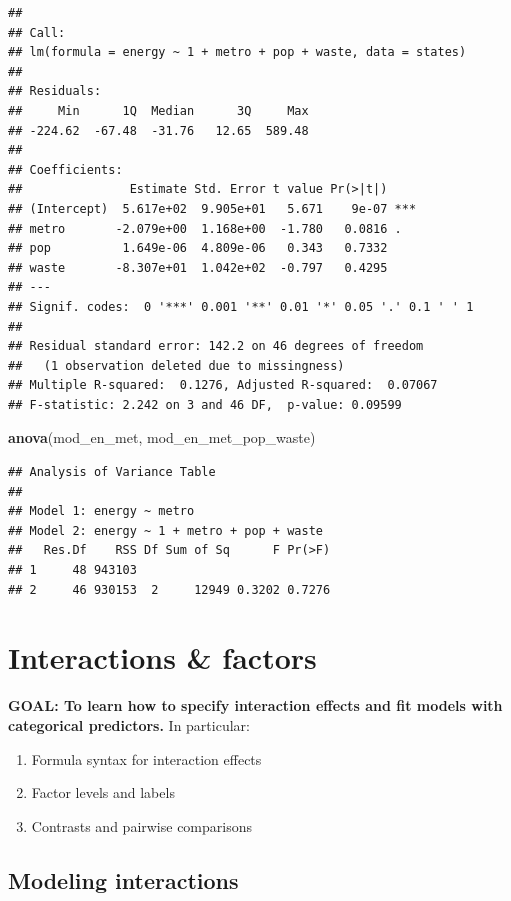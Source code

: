 \documentclass[
]{book}
\newenvironment{Shaded}{\begin{snugshade}}{\end{snugshade}}
\newcommand{\KeywordTok}[1]{\textcolor[rgb]{0.13,0.29,0.53}{\textbf{#1}}}
\newcommand{\NormalTok}[1]{#1}
\providecommand{\tightlist}{%
  \setlength{\itemsep}{0pt}\setlength{\parskip}{0pt}}
\begin{document}
\begin{verbatim}
## 
## Call:
## lm(formula = energy ~ 1 + metro + pop + waste, data = states)
## 
## Residuals:
##     Min      1Q  Median      3Q     Max 
## -224.62  -67.48  -31.76   12.65  589.48 
## 
## Coefficients:
##               Estimate Std. Error t value Pr(>|t|)    
## (Intercept)  5.617e+02  9.905e+01   5.671    9e-07 ***
## metro       -2.079e+00  1.168e+00  -1.780   0.0816 .  
## pop          1.649e-06  4.809e-06   0.343   0.7332    
## waste       -8.307e+01  1.042e+02  -0.797   0.4295    
## ---
## Signif. codes:  0 '***' 0.001 '**' 0.01 '*' 0.05 '.' 0.1 ' ' 1
## 
## Residual standard error: 142.2 on 46 degrees of freedom
##   (1 observation deleted due to missingness)
## Multiple R-squared:  0.1276, Adjusted R-squared:  0.07067 
## F-statistic: 2.242 on 3 and 46 DF,  p-value: 0.09599
\end{verbatim}

\begin{Shaded}
\begin{Highlighting}[]
  \KeywordTok{anova}\NormalTok{(mod\_en\_met, mod\_en\_met\_pop\_waste)}
\end{Highlighting}
\end{Shaded}

\begin{verbatim}
## Analysis of Variance Table
## 
## Model 1: energy ~ metro
## Model 2: energy ~ 1 + metro + pop + waste
##   Res.Df    RSS Df Sum of Sq      F Pr(>F)
## 1     48 943103                           
## 2     46 930153  2     12949 0.3202 0.7276
\end{verbatim}

\hypertarget{interactions-factors}{%
\section{Interactions \& factors}\label{interactions-factors}}

\textbf{GOAL: To learn how to specify interaction effects and fit models with categorical predictors.} In particular:

\begin{enumerate}
\def\labelenumi{\arabic{enumi}.}
\tightlist
\item
  Formula syntax for interaction effects
\item
  Factor levels and labels
\item
  Contrasts and pairwise comparisons
\end{enumerate}

\hypertarget{modeling-interactions}{%
\subsection{Modeling interactions}\label{modeling-interactions}}
\end{document}
